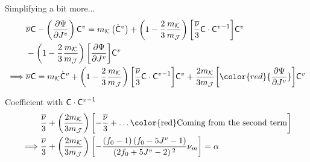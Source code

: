 \documentclass{beamer}
\def\myPsi{{\mathrm{\Psi}}}
\def\myC{{\bf\mathsf{C}}}
\newcommand\lrB[1]{{\left[#1 \right]}}
\begin{document}
    \begin{frame}
        \begin{block}{\footnotesize Simplifying a bit more...}
           \footnotesize\begin{align*}
            & \overline{\nu}\myC -
            \left({\del{\myPsi}{J^v}}\right) {\myC}^v
             = m_\mathcal{K}
            \left(
                \dot{\myC}^v
            \right)
            +
            \lr{1
            - \frac{2}{3}\frac{m_\mathcal{K}}{m_\mathcal{J}}
            }\lrB{
                \frac{\overline{\nu}}{3}{\myC}\cdot{\myC^v}^{-1}}{\myC}^v
            \\ 
            &-\lr{1-\frac{2}{3}\frac{m_\mathcal{K}}{m_\mathcal{J}}}\lrB{    
           {\del{\myPsi}{J^v}}
            }\myC^v\\
            \implies & \overline{\nu}\myC = m_\mathcal{K}\dot{\myC}^v+\lr{1
            - \frac{2}{3}\frac{m_\mathcal{K}}{m_\mathcal{J}}
            }\lrB{
                \frac{\overline{\nu}}{3}{\myC}\cdot{\myC^v}^{-1}}{\myC}^v
                +
                \frac{2m_\mathcal{K}}{3m_\mathcal{J}}\lrB{\color{red}    
                   {\del{\myPsi}{J^v}}
                    }\myC^v
           \end{align*}
        \end{block}
        \begin{block}{\footnotesize Coefficient with $\myC\cdot{\myC^v}^{-1}$}
            \footnotesize\begin{align*}
                &\frac{\overline{\nu}}{3}+\lr{\frac{2m_\mathcal{K}}{3m_\mathcal{J}}}\lrB{
                    -\frac{\overline{\nu}}{3}
                    +\dots\text{\color{red}Coming from the second term}
                }\\
                \implies & \frac{\overline{\nu}}{3}+\lr{\frac{2m_\mathcal{K}}{3m_\mathcal{J}}}
                \lrB{
                    -\frac{(f_0-1)\left(f_0-5 J^v-1\right)}{\left(2 f_0+5 J^v-2\right){}^2}
                    \nu _m } = \alpha
            \end{align*}
        \end{block}
    \end{frame}
\end{document}
